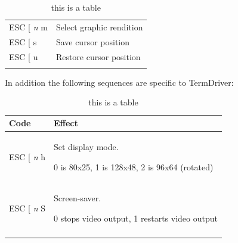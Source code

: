 \documentclass{article}
\begin{document}
\begin{longtable}[]{@{}ll@{}}
\begin{minipage}[t]{0.34\columnwidth}
ESC {[} \emph{n} m\strut
\end{minipage} & \begin{minipage}[t]{0.60\columnwidth}\raggedright
Select graphic rendition\strut
\end{minipage}\tabularnewline
\begin{minipage}[t]{0.34\columnwidth}\raggedright
ESC {[} s\strut
\end{minipage} & \begin{minipage}[t]{0.60\columnwidth}\raggedright
Save cursor position\strut
\end{minipage}\tabularnewline
\begin{minipage}[t]{0.34\columnwidth}\raggedright
ESC {[} u\strut
\end{minipage} & \begin{minipage}[t]{0.60\columnwidth}\raggedright
Restore cursor position\strut
\end{minipage}\tabularnewline
\bottomrule
\caption{this is a table}
\end{longtable}

In addition the following sequences are specific to TermDriver:

\begin{longtable}[]{@{}ll@{}}
\toprule
\begin{minipage}[b]{0.34\columnwidth}\raggedright
Code\strut
\end{minipage} & \begin{minipage}[b]{0.60\columnwidth}\raggedright
Effect\strut
\end{minipage}\tabularnewline
\midrule
\endhead
\begin{minipage}[t]{0.34\columnwidth}\raggedright
ESC {[} \emph{n} h\strut
\end{minipage} & \begin{minipage}[t]{0.60\columnwidth}\raggedright
Set display mode.

0 is 80x25, 1 is 128x48, 2 is 96x64 (rotated)\strut
\end{minipage}\tabularnewline
\begin{minipage}[t]{0.34\columnwidth}\raggedright
ESC {[} \emph{n} S\strut
\end{minipage} & \begin{minipage}[t]{0.60\columnwidth}\raggedright
Screen-saver.

0 stops video output, 1 restarts video output\strut
\end{minipage}\tabularnewline
\bottomrule
\caption{this is a table}
\end{longtable}
\end{document}
